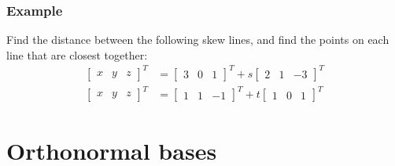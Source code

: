 \documentclass[11pt,t]{beamer}
\begin{document}
\begin{frame}\frametitle{Example}
 Find the distance between the following skew lines, and find the points on each line that are closest together:
\begin{align*}
 \begin{bmatrix}x&y&z\end{bmatrix}^T & = \begin{bmatrix}3&0&1\end{bmatrix}^T+s\begin{bmatrix}2&1&-3\end{bmatrix}^T\\
 \begin{bmatrix}x&y&z\end{bmatrix}^T & = \begin{bmatrix}1&1&-1\end{bmatrix}^T+t\begin{bmatrix}1&0&1\end{bmatrix}^T
\end{align*}

\end{frame}
\section{Orthonormal bases}
\end{document}
